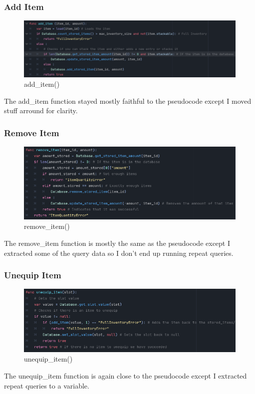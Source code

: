 \documentclass{article}
\begin{document}
        \subsubsection{Add Item}
        \begin{figure}[H]
                \centering
                \includegraphics[width=0.8\columnwidth]{images/development/add_item.PNG}
                \caption{add\_item()}
        \end{figure}
        \[\]
        The add\_item function stayed mostly faithful to the pseudocode except I moved stuff arround for clarity.\\
        \subsubsection{Remove Item}
        \begin{figure}[H]
                \centering
                \includegraphics[width=0.8\columnwidth]{images/development/remove_item.PNG}
                \caption{remove\_item()}
        \end{figure}
        \[\]
        The remove\_item function is mostly the same as the pseudocode except I extracted some of the query data so I don't end up running repeat queries.\\
        \subsubsection{Unequip Item}
        \begin{figure}[H]
                \centering
                \includegraphics[width=0.8\columnwidth]{images/development/unequip_item.PNG}
                \caption{unequip\_item()}
        \end{figure}
        \[\]
        The unequip\_item function is again close to the pseudocode except I extracted repeat queries to a variable.\\
\end{document}

